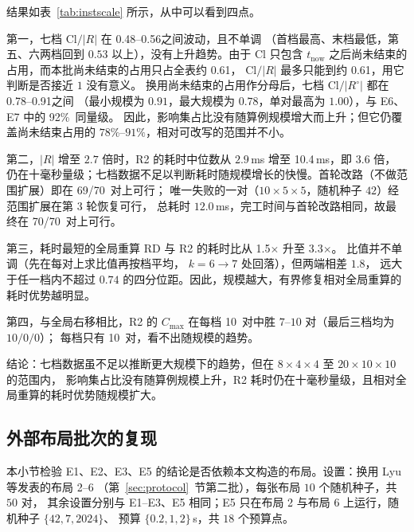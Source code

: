 \documentclass[manuscript,screen,review]{acmart}
\newcommand{\NSeeds}{10}
\newcommand{\ClosureAliveFrac}{92\%}
\newcommand{\NPubPairs}{50}
\newcommand{\ScalePairs}{70}
\newcommand{\ScaleJobsHi}{20}
\newcommand{\ScaleMachHi}{10}
\newcommand{\ScaleCloLo}{0.48}       %
\newcommand{\ScaleCloHi}{0.56}       %
\newcommand{\ScaleAliveShare}{0.61}  %
\newcommand{\ScaleCloAliveLo}{0.78}  %
\newcommand{\ScaleCloAliveHi}{0.91}  %
\newcommand{\ScaleMsHi}{10.4}        %
\newcommand{\ScaleRatioLo}{1.5}      %
\newcommand{\ScaleRatioHi}{3.3}      %
\newcommand{\ScaleFeasFirst}{69/\ScalePairs}   %
\newcommand{\ScaleFeasAll}{\ScalePairs/\ScalePairs}
\begin{document}
结果如表~\ref{tab:instscale} 所示，从中可以看到四点。

第一，七档 \(\mathrm{Cl}/|R|\) 在 \ScaleCloLo--\ScaleCloHi 之间波动，且不单调
（首档最高、末档最低，第五、六两档回到 \(0.53\) 以上），没有上升趋势。由于 \(\mathrm{Cl}\) 只包含
\(t_{\mathrm{now}}\) 之后尚未结束的占用，而本批尚未结束的占用只占全表约 \ScaleAliveShare，
\(\mathrm{Cl}/|R|\) 最多只能到约 \ScaleAliveShare，用它判断是否接近 \(1\) 没有意义。
换用尚未结束的占用作分母后，七档 \(\mathrm{Cl}/|R^{\circ}|\) 都在 \ScaleCloAliveLo--\ScaleCloAliveHi 之间
（最小规模为 \(0.91\)，最大规模为 \(0.78\)，单对最高为 \(1.00\)），与 E6、E7 中的 \ClosureAliveFrac\ 同量级。
因此，影响集占比没有随算例规模增大而上升；但它仍覆盖尚未结束占用的 \(78\%\)--\(91\%\)，相对可改写的范围并不小。

第二，\(|R|\) 增至 \(2.7\) 倍时，R2 的耗时中位数从 \(2.9\)\,ms 增至 \ScaleMsHi\,ms，即 \(3.6\) 倍，
仍在十毫秒量级；七档数据不足以判断耗时随规模增长的快慢。首轮改路（不做范围扩展）即在 \ScaleFeasFirst\ 对上可行；
唯一失败的一对（\(10\times5\times5\)，随机种子 \(42\)）经范围扩展在第 \(3\) 轮恢复可行，
总耗时 \(12.0\)\,ms，完工时间与首轮改路相同，故最终在 \ScaleFeasAll\ 对上可行。

第三，耗时最短的全局重算 RD 与 R2 的耗时比从 \ScaleRatioLo\(\times\) 升至 \ScaleRatioHi\(\times\)。
比值并不单调（先在每对上求比值再按档平均， \(k=6\to 7\) 处回落），但两端相差 \(1.8\)，
远大于任一档内不超过 \(0.74\) 的四分位距。因此，规模越大，有界修复相对全局重算的耗时优势越明显。

第四，与全局右移相比，R2 的 \(C_{\max}\) 在每档 \NSeeds\ 对中胜 \(7\)--\(10\) 对（最后三档均为 \(10/0/0\)）；
每档只有 \NSeeds\ 对，看不出随规模的趋势。

结论：七档数据虽不足以推断更大规模下的趋势，但在 \(8\times4\times4\) 至 \(\ScaleJobsHi\times\ScaleMachHi\times\ScaleMachHi\) 的范围内，
影响集占比没有随算例规模上升，R2 耗时仍在十毫秒量级，且相对全局重算的耗时优势随规模扩大。

\subsection{外部布局批次的复现}
\label{sec:pubrepro}

本小节检验 E1、E2、E3、E5 的结论是否依赖本文构造的布局。设置：换用 Lyu 等发表的布局 2--6
（第~\ref{sec:protocol}~节第二批），每张布局 \(\NSeeds\) 个随机种子，共 \(\NPubPairs\) 对，
其余设置分别与 E1--E3、E5 相同；E5 只在布局 2 与布局 6 上运行，随机种子 \(\{42,7,2024\}\)、
预算 \(\{0.2,1,2\}\)\,s，共 \(18\) 个预算点。
\end{document}
